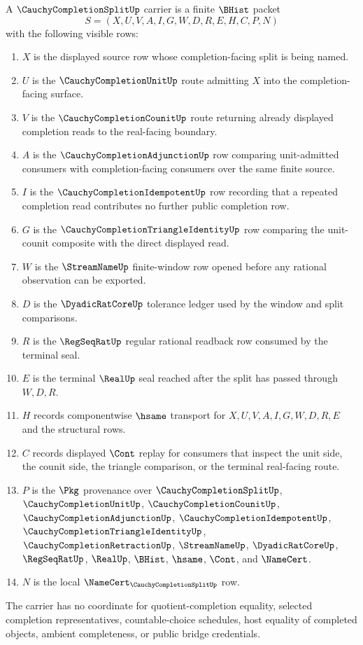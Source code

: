 \begin{definition}
\label{def:cauchy-completion-split-carrier}
A $\CauchyCompletionSplitUp$ carrier is a finite $\BHist$ packet
$$
S=(X,U,V,A,I,G,W,D,R,E,H,C,P,N)
$$
with the following visible rows:
\begin{enumerate}
\item $X$ is the displayed source row whose completion-facing split is being named.
\item $U$ is the $\CauchyCompletionUnitUp$ route admitting $X$ into the completion-facing surface.
\item $V$ is the $\CauchyCompletionCounitUp$ route returning already displayed completion reads to the real-facing boundary.
\item $A$ is the $\CauchyCompletionAdjunctionUp$ row comparing unit-admitted consumers with completion-facing consumers over the same finite source.
\item $I$ is the $\CauchyCompletionIdempotentUp$ row recording that a repeated completion read contributes no further public completion row.
\item $G$ is the $\CauchyCompletionTriangleIdentityUp$ row comparing the unit-counit composite with the direct displayed read.
\item $W$ is the $\StreamNameUp$ finite-window row opened before any rational observation can be exported.
\item $D$ is the $\DyadicRatCoreUp$ tolerance ledger used by the window and split comparisons.
\item $R$ is the $\RegSeqRatUp$ regular rational readback row consumed by the terminal seal.
\item $E$ is the terminal $\RealUp$ seal reached after the split has passed through $W,D,R$.
\item $H$ records componentwise $\hsame$ transport for $X,U,V,A,I,G,W,D,R,E$ and the structural rows.
\item $C$ records displayed $\Cont$ replay for consumers that inspect the unit side, the counit side, the triangle comparison, or the terminal real-facing route.
\item $P$ is the $\Pkg$ provenance over $\CauchyCompletionSplitUp$, $\CauchyCompletionUnitUp$, $\CauchyCompletionCounitUp$, $\CauchyCompletionAdjunctionUp$, $\CauchyCompletionIdempotentUp$, $\CauchyCompletionTriangleIdentityUp$, $\CauchyCompletionRetractionUp$, $\StreamNameUp$, $\DyadicRatCoreUp$, $\RegSeqRatUp$, $\RealUp$, $\BHist$, $\hsame$, $\Cont$, and $\NameCert$.
\item $N$ is the local $\NameCert_{\CauchyCompletionSplitUp}$ row.
\end{enumerate}
The carrier has no coordinate for quotient-completion equality, selected completion representatives, countable-choice schedules, host equality of completed objects, ambient completeness, or public bridge credentials.
\end{definition}

